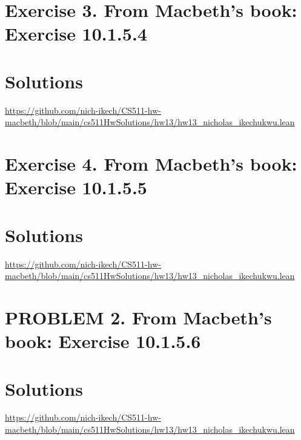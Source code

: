 \documentclass{article}
\begin{document}
\newpage
\section*{Exercise 3. From Macbeth’s book: Exercise 10.1.5.4 }
\section*{Solutions}
\url{https://github.com/nich-ikech/CS511-hw-macbeth/blob/main/cs511HwSolutions/hw13/hw13_nicholas_ikechukwu.lean}



\newpage

\section*{Exercise 4. From Macbeth’s book: Exercise 10.1.5.5 }
\section*{Solutions}
\url{https://github.com/nich-ikech/CS511-hw-macbeth/blob/main/cs511HwSolutions/hw13/hw13_nicholas_ikechukwu.lean}

\newpage


\section*{PROBLEM 2. From Macbeth’s book: Exercise 10.1.5.6}
\section*{Solutions}

\url{https://github.com/nich-ikech/CS511-hw-macbeth/blob/main/cs511HwSolutions/hw13/hw13_nicholas_ikechukwu.lean}
\end{document}
